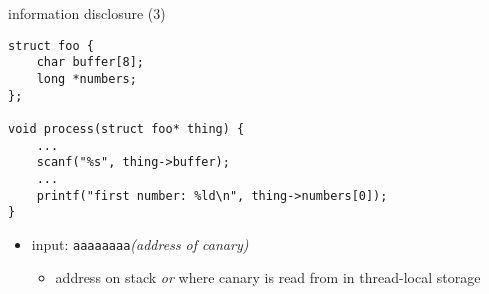 \begin{frame}[fragile,label=infoDisc3]{information disclosure (3)}
\lstset{
    language=C,
    style=smaller,
}
\begin{lstlisting}
struct foo {
    char buffer[8];
    long *numbers;
};

void process(struct foo* thing) {
    ...
    scanf("%s", thing->buffer);
    ...
    printf("first number: %ld\n", thing->numbers[0]);
}
\end{lstlisting}
\begin{itemize}
\item input: {\tt aaaaaaaa}\textit{(address of canary)}
    \begin{itemize}
    \item address on stack \textit{or} where canary is read from in thread-local storage
    \end{itemize}
\end{itemize}
\end{frame}

